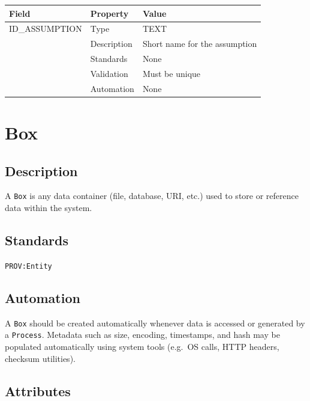 \documentclass[
]{article}
\newcounter{none}
\begin{document}
{\def\LTcaptype{none} 
\begin{longtable}[]{@{}lll@{}}
\toprule\noalign{}
Field & Property & Value \\
\midrule\noalign{}
\endhead
\bottomrule\noalign{}
\endlastfoot
ID\_ASSUMPTION & Type & TEXT \\
& Description & Short name for the assumption \\
& Standards & None \\
& Validation & Must be unique \\
& Automation & None \\
\end{longtable}
}

\section{Box}\label{box}

\subsection{Description}\label{description-4}

A \texttt{Box} is any data container (file, database, URI, etc.) used to
store or reference data within the system.

\subsection{Standards}\label{standards-6}

\texttt{PROV:Entity}

\subsection{Automation}\label{automation-6}

A \texttt{Box} should be created automatically whenever data is accessed
or generated by a \texttt{Process}. Metadata such as size, encoding,
timestamps, and hash may be populated automatically using system tools
(e.g.~OS calls, HTTP headers, checksum utilities).

\subsection{Attributes}\label{attributes-6}
\end{document}
